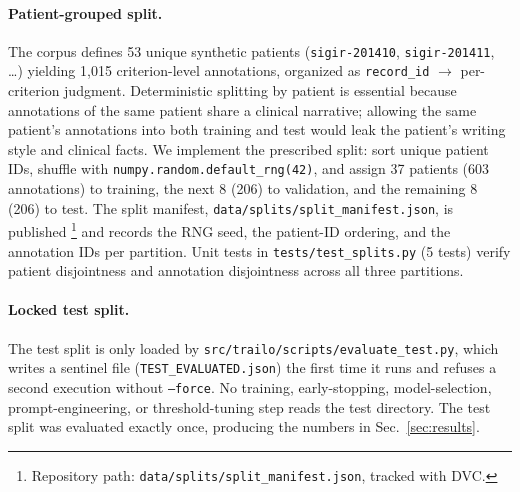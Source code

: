 \documentclass[conference]{IEEEtran}
\newcommand{\code}[1]{\texttt{\small #1}}
\begin{document}
\paragraph*{Patient-grouped split.}
The corpus defines 53 unique synthetic patients
(\code{sigir-201410}, \code{sigir-201411}, \dots) yielding 1{,}015
criterion-level annotations, organized as \code{record\_id}
$\to$ per-criterion judgment. Deterministic splitting by patient is
essential because annotations of the same patient share a clinical
narrative; allowing the same patient's annotations into both training
and test would leak the patient's writing style and clinical facts.
We implement the prescribed split: sort unique patient IDs, shuffle
with \code{numpy.random.default\_rng(42)}, and assign 37 patients
(603 annotations) to training, the next 8 (206) to validation, and
the remaining 8 (206) to test. The split manifest,
\code{data/splits/split\_manifest.json}, is published
\footnote{Repository path: \code{data/splits/split\_manifest.json},
tracked with DVC.} and records the RNG
seed, the patient-ID ordering, and the annotation IDs per partition.
Unit tests in \code{tests/test\_splits.py} (5 tests) verify patient
disjointness and annotation disjointness across all three partitions.

\paragraph*{Locked test split.}
The test split is only loaded by
\code{src/trailo/scripts/evaluate\_test.py}, which writes a sentinel
file (\code{TEST\_EVALUATED.json}) the first time it runs and
refuses a second execution without \code{--force}. No training,
early-stopping, model-selection, prompt-engineering, or
threshold-tuning step reads the test directory. The test split was
evaluated exactly once, producing the numbers in
Sec.~\ref{sec:results}.
\end{document}
